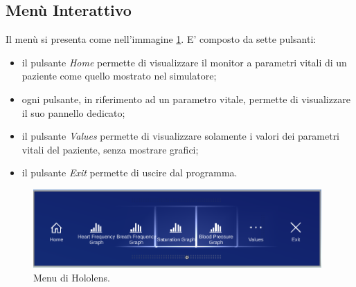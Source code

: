 \subsection{Menù Interattivo}
Il menù si presenta come nell'immagine \ref{pic:menu-hololens}. E' composto da sette pulsanti:
\begin{itemize}
    \item il pulsante \textit{Home} permette di visualizzare il monitor a parametri vitali di un paziente come quello mostrato nel simulatore;
    
    \item ogni pulsante, in riferimento ad un parametro vitale, permette di visualizzare il suo pannello dedicato;
    
    \item il pulsante \textit{Values} permette di visualizzare solamente i valori dei parametri vitali del paziente, senza mostrare grafici;
    
    \item il pulsante \textit{Exit} permette di uscire dal programma.
\end{itemize}

\begin{figure}[ht]
    \includegraphics[width=11cm]{Images/hololensMenu.PNG}
    \centering
    \caption{\label{pic:menu-hololens}Menu di Hololens.}
\end{figure}

